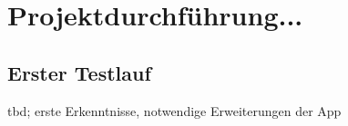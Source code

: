 \section{Projektdurchführung...}

\subsection{Erster Testlauf}
tbd; erste Erkenntnisse, notwendige Erweiterungen der App